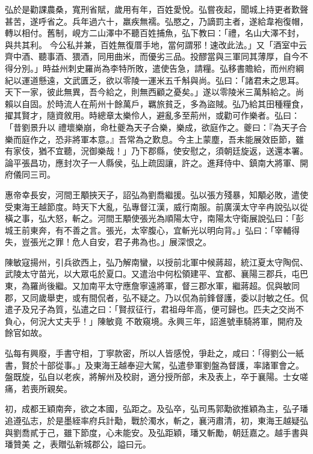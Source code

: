 \begin{pinyinscope}
 弘於是勸課農桑，寬刑省賦，歲用有年，百姓愛悅。弘嘗夜起，聞城上持更者歎聲甚苦，遂呼省之。兵年過六十，羸疾無襦。弘愍之，乃謫罰主者，遂給韋袍復帽，轉以相付。舊制，峴方二山澤中不聽百姓捕魚，弘下教曰：「禮，名山大澤不封，與共其利。
 今公私并兼，百姓無復厝手地，當何謂邪！速改此法。」又「酒室中云齊中酒、聽事酒、猥酒，同用曲米，而優劣三品。投醪當與三軍同其薄厚，自今不得分別。」時益州刺史羅尚為李特所敗，遣使告急，請糧。弘移書贍給，而州府綱紀以運道懸遠，文武匱乏，欲以零陵一運米五千斛與尚。弘曰：「諸君未之思耳。天下一家，彼此無異，吾今給之，則無西顧之憂矣。」遂以零陵米三萬斛給之。尚賴以自固。於時流人在荊州十餘萬戶，羈旅貧乏，多為盜賊。弘乃給其田種糧食，擢其賢才，隨資敘用。時總章太樂伶人，避亂多至荊州，或勸可作樂者。弘曰：「昔劉景升以
 禮壞樂崩，命杜夔為天子合樂，樂成，欲庭作之。夔曰：『為天子合樂而庭作之，恐非將軍本意。』吾常為之歎息。今主上蒙塵，吾未能展效臣節，雖有家伎，猶不宜聽，況御樂哉！」乃下郡縣，使安慰之，須朝廷旋返，送還本署。論平張昌功，應封次子一人縣侯，弘上疏固讓，許之。進拜侍中、鎮南大將軍、開府儀同三司。



 惠帝幸長安，河間王顒挾天子，詔弘為劉喬繼援。弘以張方殘暴，知顒必敗，遣使受東海王越節度。時天下大亂，弘專督江漢，威行南服。前廣漢太守辛冉說弘以從橫之事，弘大怒，斬之。河間王顒使張光為順陽太守，南陽太守衛展說弘曰：「彭
 城王前東奔，有不善之言。張光，太宰腹心，宜斬光以明向背。」弘曰：「宰輔得失，豈張光之罪！危人自安，君子弗為也。」展深恨之。



 陳敏寇揚州，引兵欲西上，弘乃解南蠻，以授前北軍中候蔣超，統江夏太守陶侃、武陵太守苗光，以大眾屯於夏口。又遣治中何松領建平、宜都、襄陽三郡兵，屯巴東，為羅尚後繼。又加南平太守應詹寧遠將軍，督三郡水軍，繼蔣超。侃與敏同郡，又同歲舉吏，或有間侃者，弘不疑之。乃以侃為前鋒督護，委以討敏之任。侃遣子及兄子為質，弘遣之曰：「賢叔征行，君祖母年高，便可歸也。匹夫之交尚不負心，何況大丈夫乎！」陳敏竟
 不敢窺境。永興三年，詔進號車騎將軍，開府及餘官如故。



 弘每有興廢，手書守相，丁寧款密，所以人皆感悅，爭赴之，咸曰：「得劉公一紙書，賢於十部從事。」及東海王越奉迎大駕，弘遣參軍劉盤為督護，率諸軍會之。盤既旋，弘自以老疾，將解州及校尉，適分授所部，未及表上，卒于襄陽。士女嗟痛，若喪所親矣。



 初，成都王穎南奔，欲之本國，弘距之。及弘卒，弘司馬郭勱欲推穎為主，弘子璠追遵弘志，於是墨絰率府兵計勱，戰於濁水，斬之，襄沔肅清，初，東海王越疑弘與劉喬貳于己，雖下節度，心未能安。及弘距穎，璠又斬勵，朝廷嘉之。越手書與璠贊美
 之，表贈弘新城郡公，謚曰元。




\end{pinyinscope}
